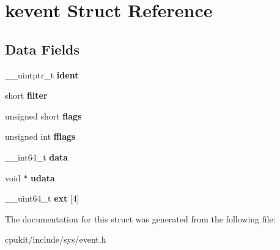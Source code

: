 \hypertarget{structkevent}{}\section{kevent Struct Reference}
\label{structkevent}
\subsection*{Data Fields}
\begin{DoxyCompactItemize}
\item 
\mbox{\label{structkevent_a5c919c6f550e6887cc173cec453eda88}} 
\+\_\+\+\_\+uintptr\+\_\+t {\bfseries ident}
\item 
\mbox{\label{structkevent_acf52dd1251b947adf79ed58850b1e214}} 
short {\bfseries filter}
\item 
\mbox{\label{structkevent_a76dc20017fad40c016fe037651921caa}} 
unsigned short {\bfseries flags}
\item 
\mbox{\label{structkevent_a89f1b47ccf6d01cbc93c8953032c4563}} 
unsigned int {\bfseries fflags}
\item 
\mbox{\label{structkevent_ac5adc96bcb272fee6c07bec184a0702a}} 
\+\_\+\+\_\+int64\+\_\+t {\bfseries data}
\item 
\mbox{\label{structkevent_a4b863201999be15a2fdeefb0abe4e716}} 
void $\ast$ {\bfseries udata}
\item 
\mbox{\label{structkevent_a23cca53e5a076013f87014410711b029}} 
\+\_\+\+\_\+uint64\+\_\+t {\bfseries ext} \mbox{[}4\mbox{]}
\end{DoxyCompactItemize}


The documentation for this struct was generated from the following file\+:\begin{DoxyCompactItemize}
\item 
cpukit/include/sys/event.\+h\end{DoxyCompactItemize}
